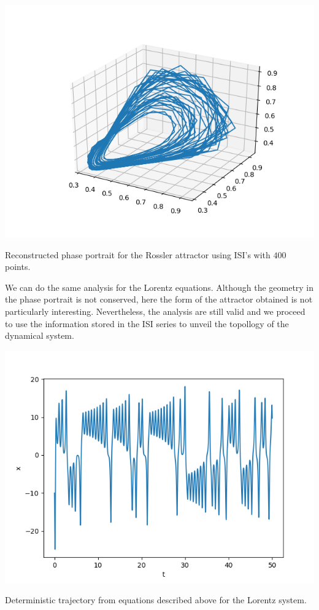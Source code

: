 \documentclass[10pt]{article}
\begin{document}
\begin{center}
\includegraphics[scale=0.5]{rossler_atractor_400points}
\caption{Reconstructed phase portrait for the Rossler attractor using ISI's with $400$ points.}
\label{fig:rossler_isi}
\end{center}

We can do the same analysis for the Lorentz equations. Although the geometry in the phase portrait is not conserved, here the form of the attractor obtained is not particularly interesting. Nevertheless, the analysis are still valid and we proceed to use the information stored in the ISI series to unveil the topollogy of the dynamical system.

\begin{center}
\includegraphics[scale=0.5]{real_trajectory_lorentz}
\caption{Deterministic trajectory from equations described above for the Lorentz system.}
\label{fig:lorentz_trajectory}
\end{center}
\end{document}
